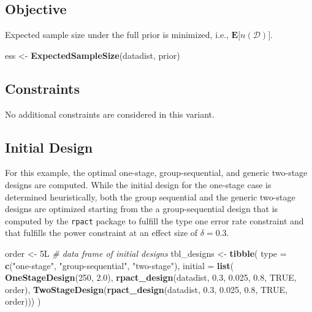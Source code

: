\documentclass[
]{book}
\newenvironment{Shaded}{\begin{snugshade}}{\end{snugshade}}
\newcommand{\CommentTok}[1]{\textcolor[rgb]{0.56,0.35,0.01}{\textit{#1}}}
\newcommand{\DataTypeTok}[1]{\textcolor[rgb]{0.13,0.29,0.53}{#1}}
\newcommand{\DecValTok}[1]{\textcolor[rgb]{0.00,0.00,0.81}{#1}}
\newcommand{\FloatTok}[1]{\textcolor[rgb]{0.00,0.00,0.81}{#1}}
\newcommand{\KeywordTok}[1]{\textcolor[rgb]{0.13,0.29,0.53}{\textbf{#1}}}
\newcommand{\NormalTok}[1]{#1}
\newcommand{\OtherTok}[1]{\textcolor[rgb]{0.56,0.35,0.01}{#1}}
\newcommand{\StringTok}[1]{\textcolor[rgb]{0.31,0.60,0.02}{#1}}
\begin{document}
\hypertarget{objective-3}{%
\subsection{Objective}\label{objective-3}}

Expected sample size under the full prior is minimized, i.e.,
\(\boldsymbol{E}\big[n(\mathcal{D})\big]\).

\begin{Shaded}
\begin{Highlighting}[]
\NormalTok{ess <-}\StringTok{ }\KeywordTok{ExpectedSampleSize}\NormalTok{(datadist, prior)}
\end{Highlighting}
\end{Shaded}

\hypertarget{constraints-3}{%
\subsection{Constraints}\label{constraints-3}}

No additional constraints are considered in this variant.

\hypertarget{initial-design-2}{%
\subsection{Initial Design}\label{initial-design-2}}

For this example, the optimal one-stage, group-sequential, and generic
two-stage designs are computed.
While the initial design for the one-stage case is determined heuristically,
both the group sequential and the generic two-stage designs are
optimized starting from the a group-sequential design that is computed by
the \texttt{rpact} package to fulfill the type one error rate constraint and
that fulfills the power constraint at an effect size of \(\delta = 0.3\).

\begin{Shaded}
\begin{Highlighting}[]
\NormalTok{order <-}\StringTok{ }\NormalTok{5L}
\CommentTok{# data frame of initial designs }
\NormalTok{tbl_designs <-}\StringTok{ }\KeywordTok{tibble}\NormalTok{(}
    \DataTypeTok{type    =} \KeywordTok{c}\NormalTok{(}\StringTok{"one-stage"}\NormalTok{, }\StringTok{"group-sequential"}\NormalTok{, }\StringTok{"two-stage"}\NormalTok{),}
    \DataTypeTok{initial =} \KeywordTok{list}\NormalTok{(}
        \KeywordTok{OneStageDesign}\NormalTok{(}\DecValTok{250}\NormalTok{, }\FloatTok{2.0}\NormalTok{),}
        \KeywordTok{rpact_design}\NormalTok{(datadist, }\FloatTok{0.3}\NormalTok{, }\FloatTok{0.025}\NormalTok{, }\FloatTok{0.8}\NormalTok{, }\OtherTok{TRUE}\NormalTok{, order),}
        \KeywordTok{TwoStageDesign}\NormalTok{(}\KeywordTok{rpact_design}\NormalTok{(datadist, }\FloatTok{0.3}\NormalTok{, }\FloatTok{0.025}\NormalTok{, }\FloatTok{0.8}\NormalTok{, }\OtherTok{TRUE}\NormalTok{, order))) )}
\end{Highlighting}
\end{Shaded}
\end{document}
